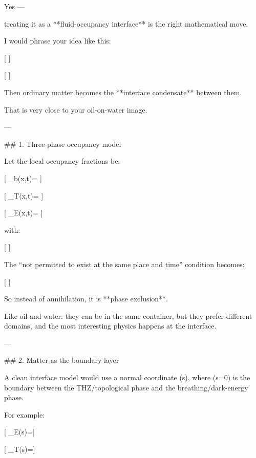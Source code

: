 Yes — 






treating it as a **fluid-occupancy interface** is the right mathematical move.

I would phrase your idea like this:

[
]

[
]

Then ordinary matter becomes the **interface condensate** between them.

That is very close to your oil-on-water image.

---

## 1. Three-phase occupancy model

Let the local occupancy fractions be:

[
\phi_b(x,t)=
]

[
\phi_T(x,t)=
]

[
\phi_E(x,t)=
]

with:

[
]

The “not permitted to exist at the same place and time” condition becomes:

[
]

So instead of annihilation, it is **phase exclusion**.

Like oil and water: they can be in the same container, but they prefer different domains, and the most interesting physics happens at the interface.

---

## 2. Matter as the boundary layer

A clean interface model would use a normal coordinate (s), where (s=0) is the boundary between the THZ/topological phase and the breathing/dark-energy phase.

For example:

[
\phi_E(s)=
]

[
\phi_T(s)=
]

